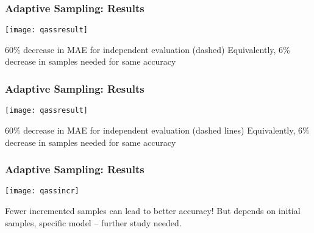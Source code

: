 \begin{frame}
    \frametitle{Adaptive Sampling: Results}
    \vspace{-10pt}
    \begin{center}
    \texttt{[image: qassresult]}
    \end{center}
    
    $60\%$ decrease in MAE for independent evaluation (dashed) \newline
    Equivalently, $6\%$ decrease in samples needed for same accuracy

\end{frame}

\begin{frame}
    \frametitle{Adaptive Sampling: Results}
    \vspace{-10pt}
    \begin{center}
    \texttt{[image: qassresult]}
    \end{center}
    
    $60\%$ decrease in MAE for independent evaluation (dashed lines) \newline
    Equivalently, $6\%$ decrease in samples needed for same accuracy

\end{frame}

\begin{frame}
    \frametitle{Adaptive Sampling: Results}
    \vspace{-10pt}
    \begin{center}
    \texttt{[image: qassincr]}
    \end{center}
    
    Fewer incremented samples can lead to better accuracy! \newline
    But depends on initial samples, specific model -- further study needed.

\end{frame}
